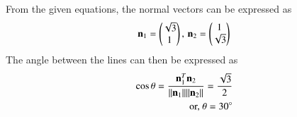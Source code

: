 From    the given equations, the normal vectors can be expressed as
   \begin{align}
	   \mathbf{n}_1=\begin{pmatrix}\sqrt{3}\\1\end{pmatrix},\,
	   \mathbf{n}_2=\begin{pmatrix}1\\\sqrt{3}\end{pmatrix}
   \end{align}
The angle between the lines can then be expressed as
\begin{align}
	\cos\theta=\frac{\mathbf{n}_1^T\mathbf{n}_2}{\lVert\mathbf{n}_1\rVert\lVert\mathbf{n}_2\rVert}
	=\frac{\sqrt{3}}{2} 
	\\
	\text{or, }
\theta=30\degree
\end{align}
